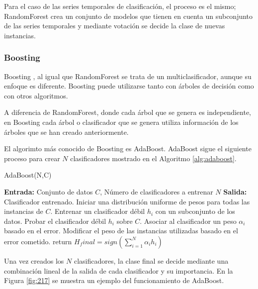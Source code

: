 Para el caso de las series temporales de clasificación, el proceso es el mismo; RandomForest crea un conjunto de modelos que tienen en cuenta un subconjunto de las series temporales y mediante votación se decide la clase de nuevas instancias.

\subsubsection{Boosting}
Boosting \cite{schapire1999brief}, al igual que RandomForest se trata de un multiclasificador, aunque su enfoque es diferente. Boosting puede utilizarse tanto con árboles de decisión como con otros algoritmos.\newline

A diferencia de RandomForest, donde cada árbol que se genera es independiente, en Boosting cada árbol o clasificador que se genera utiliza información de los árboles que se han creado anteriormente.\newline

El algorimto más conocido de Boosting es AdaBoost. AdaBoost sigue el siguiente proceso para crear $N$ clasificadores mostrado en el Algoritmo \ref{alg:adaboost}. \newline

\begin{algorithm}[H]
	\caption{AdaBoost(N,C)}
	\label{alg:adaboost}
	\begin{algorithmic}[0]
		\State \textbf{Entrada:} Conjunto de datos $C$, Número de clasificadores a entrenar $N$
		\State \textbf{Salida:} Clasificador entrenado.
		\State Iniciar una distribución uniforme de pesos para todas las instancias de $C$.
			\State Entrenar un clasificador débil $h_i$ con un subconjunto de los datos.
			\State Probar el clasificador débil $h_i$ sobre $C$.
			\State Asociar al clasificador un peso $\alpha_i$ basado en el error.
			\State Modificar el peso de las instancias utilizadas basado en el error cometido.
		\EndFor
		\State return $H_final = sign(\sum_{i=1}^{N}\alpha_ih_i)$
	\end{algorithmic}
\end{algorithm}
\verticalspace

Una vez creados los $N$ clasificadores, la clase final se decide mediante una combinación lineal de la salida de cada clasificador y su importancia. En la Figura \ref{fig:217} se muestra un ejemplo del funcionamiento de AdaBoost.\newline

